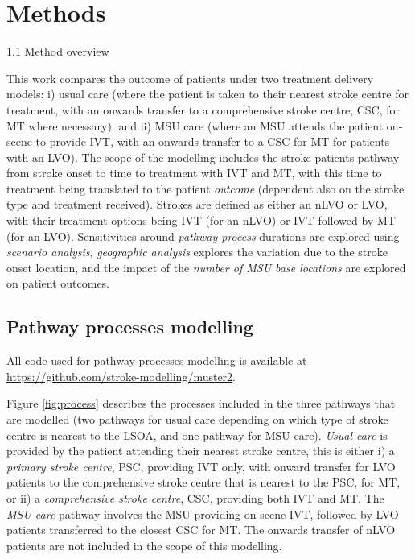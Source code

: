\section{Methods}

1.1 Method overview

This work compares the outcome of patients under two treatment delivery models: i) usual care (where the patient is taken to their nearest stroke centre for treatment, with an onwards transfer to a comprehensive stroke centre, CSC, for MT where necessary). and ii) MSU care (where an MSU attends the patient on-scene to provide IVT, with an onwards transfer to a CSC for MT for patients with an LVO). The scope of the modelling includes the stroke patients pathway from stroke onset to time to treatment with IVT and MT, with this time to treatment being translated to the patient \textit{outcome} (dependent also on the stroke type and treatment received). Strokes are defined as either an nLVO or LVO, with their treatment options being IVT (for an nLVO) or IVT followed by MT (for an LVO). Sensitivities around \textit{pathway process} durations are explored using \textit{scenario analysis}, \textit{geographic analysis} explores the variation due to the stroke onset location, and the impact of the \textit{number of MSU base locations} are explored on patient outcomes.

\subsection{Pathway processes modelling}

All code used for pathway processes modelling is available at \url{https://github.com/stroke-modelling/muster2}.

Figure \ref{fig:process} describes the processes included in the three pathways that are modelled (two pathways for usual care depending on which type of stroke centre is nearest to the LSOA, and one pathway for MSU care). \textit{Usual care} is provided by the patient attending their nearest stroke centre, this is either i) a \textit{primary stroke centre}, PSC, providing IVT only, with onward transfer for LVO patients to the comprehensive stroke centre that is nearest to the PSC, for MT, or ii) a \textit{comprehensive stroke centre}, CSC, providing both IVT and MT. The \textit{MSU care} pathway involves the MSU providing on-scene IVT, followed by LVO patients transferred to the closest CSC for MT. The onwards transfer of nLVO patients are not included in the scope of this modelling.

